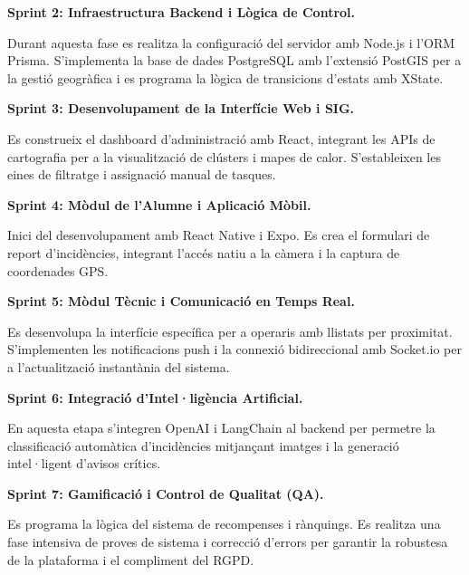 \begin{flushleft}
	\textbf{Sprint 2: Infraestructura Backend i Lògica de Control.} \\
\end{flushleft}
Durant aquesta fase es realitza la configuració del servidor amb Node.js i l'ORM Prisma. S'implementa la base de dades PostgreSQL amb l'extensió PostGIS per a la gestió geogràfica i es programa la lògica de transicions d'estats amb XState.

\begin{flushleft}
	\textbf{Sprint 3: Desenvolupament de la Interfície Web i SIG. } \\
\end{flushleft}
Es construeix el dashboard d'administració amb React, integrant les APIs de cartografia per a la visualització de clústers i mapes de calor. S'estableixen les eines de filtratge i assignació manual de tasques.

\begin{flushleft}
	\textbf{Sprint 4: Mòdul de l'Alumne i Aplicació Mòbil. } \\
\end{flushleft}
Inici del desenvolupament amb React Native i Expo\cite{3}. Es crea el formulari de report d'incidències, integrant l'accés natiu a la càmera i la captura de coordenades GPS.

\begin{flushleft}
	\textbf{Sprint 5: Mòdul Tècnic i Comunicació en Temps Real. } \\
\end{flushleft}
Es desenvolupa la interfície específica per a operaris amb llistats per proximitat. S'implementen les notificacions push i la connexió bidireccional amb Socket.io per a l'actualització instantània del sistema.

\begin{flushleft}
	\textbf{Sprint 6: Integració d'Intel·ligència Artificial.} \\
\end{flushleft}
En aquesta etapa s'integren OpenAI i LangChain al backend per permetre la classificació automàtica d'incidències mitjançant imatges i la generació intel·ligent d'avisos crítics.

\begin{flushleft}
	\textbf{Sprint 7: Gamificació i Control de Qualitat (QA).} \\
\end{flushleft}
Es programa la lògica del sistema de recompenses i rànquings. Es realitza una fase intensiva de proves de sistema i correcció d'errors per garantir la robustesa de la plataforma i el compliment del RGPD.

